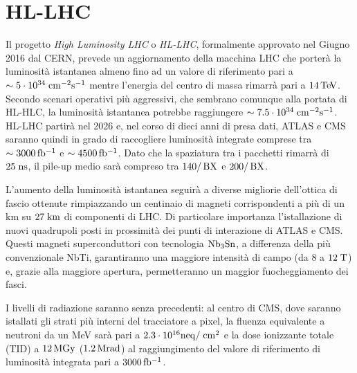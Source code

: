 \section{HL-LHC}
Il progetto {\em High Luminosity LHC} o {\em HL-LHC}, formalmente approvato nel Giugno 2016 dal CERN, prevede un aggiornamento della macchina LHC che porter\`a la luminosit\`a istantanea almeno fino ad un valore di riferimento pari a $\sim \nobreak 5\cdot10^{34}\rm \; cm^{-2}{\mathrm s}^{-1}$ mentre l'energia del centro di massa rimarr\`a pari a $14{\rm \, Te\kern-0.125em V}$. 
Secondo scenari operativi pi\`u aggressivi, che sembrano comunque alla portata di HL-HLC, la luminosit\`a istantanea potrebbe raggiungere $\sim \nobreak  7.5\cdot10^{34}\rm \; cm^{-2}{\mathrm s}^{-1}$. HL-LHC partir\`a nel 2026 e, nel corso di dieci anni di presa dati, ATLAS e CMS saranno quindi in grado di raccogliere luminosit\`a integrate comprese tra $\sim3000{\rm \, fb^{-1}}$ e $\sim4500{\rm \, fb^{-1}}$. Dato che la spaziatura tra i pacchetti rimarr\`a di $25\rm \; ns$, il pile-up medio sar\`a compreso tra $140/\rm \, BX$ e $200/\rm \, BX$.

L'aumento della luminosit\`a istantanea seguir\`a a diverse migliorie dell'ottica di fascio ottenute rimpiazzando un centinaio di magneti corrispondenti a pi\`u di un km su $27\rm \; km$ di componenti di LHC. Di particolare importanza l'istallazione di nuovi quadrupoli posti in prossimit\`a dei punti di interazione di ATLAS e CMS. Questi magneti superconduttori con tecnologia ${\rm Nb_3Sn}$, a differenza della pi\`u convenzionale NbTi, garantiranno una maggiore intensit\`a di campo (da 8 a $12\rm \; T$) e, grazie alla maggiore apertura, permetteranno un maggior fuocheggiamento dei fasci. 

I livelli di radiazione saranno senza precedenti: al centro di CMS, dove saranno istallati gli strati pi\`u interni del tracciatore a pixel, la fluenza equivalente a neutroni da un MeV sar\`a pari a $2.3\cdot 10^{16} {\rm neq}/\rm \; cm^2$ e la dose ionizzante totale (TID) a $12{\rm \, MGy}$ ($1.2{\rm \, Mrad}$) al raggiungimento del valore di riferimento di luminosit\`a integrata pari a $3000{\rm \, fb^{-1}}$.

